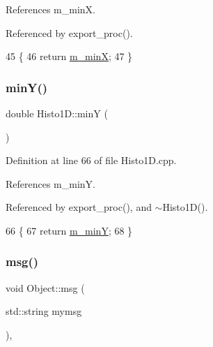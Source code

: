 References m\+\_\+minX.



Referenced by export\+\_\+proc().


\begin{DoxyCode}
45                \{ 
46     \textcolor{keywordflow}{return} \hyperlink{classHisto1D_af5ce58b20e96fa6e4b306109dd88589e}{m\_minX}; 
47   \}
\end{DoxyCode}
\mbox{\label{classHisto1D_a122c7071e060672dd2c08ad92212b3a2}} 
\subsubsection{\texorpdfstring{min\+Y()}{minY()}}
{\footnotesize\ttfamily double Histo1\+D\+::minY (\begin{DoxyParamCaption}{ }\end{DoxyParamCaption})}



Definition at line 66 of file Histo1\+D.\+cpp.



References m\+\_\+minY.



Referenced by export\+\_\+proc(), and $\sim$\+Histo1\+D().


\begin{DoxyCode}
66                     \{
67     \textcolor{keywordflow}{return} \hyperlink{classHisto1D_a3bb6c3ea23a1af14ebb10af807f3810d}{m\_minY};
68 \}
\end{DoxyCode}
\mbox{\label{classObject_a58b2d0618c2d08cf2383012611528d97}} 
\subsubsection{\texorpdfstring{msg()}{msg()}\hspace{0.1cm}{\footnotesize\ttfamily [1/2]}}
{\footnotesize\ttfamily void Object\+::msg (\begin{DoxyParamCaption}\item[{std\+::string}]{mymsg }\end{DoxyParamCaption})\hspace{0.3cm}{\ttfamily [inline]}, {\ttfamily [inherited]}}



